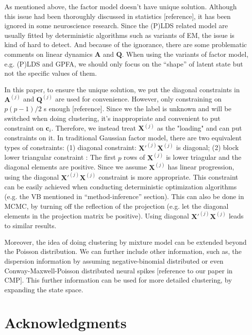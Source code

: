 \documentclass{article}
\begin{document}
	As mentioned above, the factor model doesn’t have unique solution. Although this issue had been thoroughly discussed in statistics [reference], it has been ignored in some neuroscience research. Since the (P)LDS related model are usually fitted by deterministic algorithms such as variants of EM, the issue is kind of hard to detect. And because of the ignorance, there are some problematic comments on linear dynamics $\bm{A}$ and $\bm{Q}$. When using the variants of factor model, e.g. (P)LDS and GPFA, we should only focus on the “shape” of latent state but not the specific values of them.
	
	In this paper, to ensure the unique solution, we put the diagonal constraints in $\bm{A}^{(j)}$ and $\bm{Q}^{(j)}$ are used for convenience. However, only constraining on $p(p-1)/2$ s enough [reference]. Since we the label is unknown and will be switched when doing clustering, it’s inappropriate and convenient to put constraint on $\bm{c}_i$. Therefore, we instead treat $\bm{X}^{(j)}$ as the "loading" and can put constraints on it. In traditional Gaussian factor model, there are two equivalent types of constraints: (1) diagonal constraint: $\bm{X}'^{(j)}\bm{X}^{(j)}$ is diagonal; (2) block lower triangular constraint \citep{Fokoue2003}: The first $p$ rows of $\bm{X}^{(j)}$ is lower triagular and the diagonal elements are positive. Since we assume $\bm{X}^{(j)}$ has linear progression, using the diagonal $\bm{X}'^{(j)}\bm{X}^{(j)}$ constraint is more appropriate. This constraint can be easily achieved when conducting deterministic optimization algorithms (e.g. the VB mentioned in “method-inference” section). This can also be done in MCMC, by turning off the reflection of the projection (e.g. let the diagonal elements in the projection matrix be positive). Using diagonal $\bm{X}'^{(j)}\bm{X}^{(j)}$  leads to similar results.
	
	Moreover, the idea of doing clustering by mixture model can be extended beyond the Poisson distribution. We can further include other information, such as, the dispersion information by assuming negative-binomial distributed or even Conway-Maxwell-Poisson distributed neural spikes [reference to our paper in CMP]. This further information can be used for more detailed clustering, by expanding the state space.
	
	\section*{Acknowledgments}
	
\end{document}
